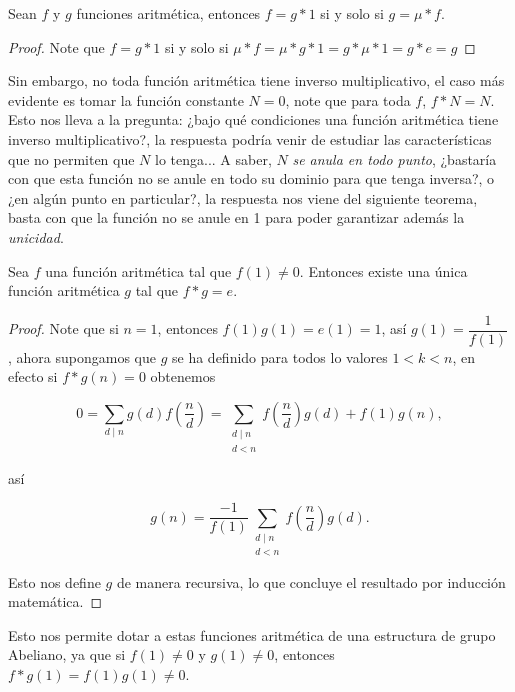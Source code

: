 \begin{theorem}
Sean $f$ y $g$ funciones aritmética, entonces $f=g*1$ si y solo si $g=\mu* f$.
\end{theorem}

\begin{proof}
Note que $f=g*1$ si y solo si $\mu*f=\mu*g*1=g*\mu*1=g*e=g$
\end{proof}

Sin embargo, no toda función aritmética tiene inverso multiplicativo, el caso más evidente es tomar la función constante $N=0$, note que para toda $f$, $f*N=N$. Esto nos lleva a la pregunta: ¿bajo qué condiciones una función aritmética tiene inverso multiplicativo?, la respuesta podría venir de estudiar las características que no permiten que $N$ lo tenga... A saber, $N$ \textit{se anula en todo punto}, ¿bastaría con que esta función no se anule en todo su dominio para que tenga inversa?, o ¿en algún punto en particular?, la respuesta nos viene del siguiente teorema, basta con que la función no se anule en 1 para poder garantizar además la \textit{unicidad}.

\begin{theorem}
 
Sea $f$ una función aritmética tal que $f(1) \neq 0$. Entonces existe una única función aritmética $g$ tal que $f*g=e$.

\end{theorem} 

\begin{proof}
Note que si $n=1$, entonces $f(1)g(1)=e(1)=1$, así $g(1)=\dfrac{1}{f(1)}$, ahora  supongamos que $g$ se ha definido para todos lo valores $1<k<n$, en efecto si $f*g(n)=0$ obtenemos

\begin{equation}
0=\sum_{d\mid n}g(d)f \left( \frac{n}{d} \right)=\sum_{\substack{d \mid n \\
d<n}} f\left(\frac{n}{d}\right) g(d)+f(1) g(n),
\end{equation}

así

$$g(n) =\frac{-1}{f(1)} \sum_{\substack{d \mid n \\
d<n}} f\left(\frac{n}{d}\right) g(d).$$

Esto nos define $g$ de manera recursiva, lo que concluye el resultado por inducción matemática.

\end{proof}


Esto nos permite dotar a estas funciones aritmética de una estructura de grupo Abeliano, ya que si $f(1)\neq 0$ y $g(1)\neq 0$, entonces $f*g(1)=f(1)g(1)\neq 0$.\\


